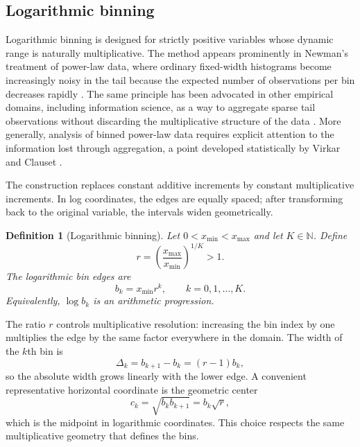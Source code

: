 \documentclass[12pt]{article}
\newcommand{\N}{\mathbb{N}}
\newtheorem{definition}{Definition}[section]
\numberwithin{equation}{section}
\begin{document}
\subsection{Logarithmic binning}

Logarithmic binning is designed for strictly positive variables whose dynamic range is naturally multiplicative. The method appears prominently in Newman's treatment of power-law data, where ordinary fixed-width histograms become increasingly noisy in the tail because the expected number of observations per bin decreases rapidly \cite{Newman2005}. The same principle has been advocated in other empirical domains, including information science, as a way to aggregate sparse tail observations without discarding the multiplicative structure of the data \cite{Milojevic2010}. More generally, analysis of binned power-law data requires explicit attention to the information lost through aggregation, a point developed statistically by Virkar and Clauset \cite{VirkarClauset2014}.

The construction replaces constant additive increments by constant multiplicative increments. In log coordinates, the edges are equally spaced; after transforming back to the original variable, the intervals widen geometrically.

\begin{definition}[Logarithmic binning]
Let $0<x_{\min}<x_{\max}$ and let $K\in\N$. Define
\begin{equation}
 r=\left(\frac{x_{\max}}{x_{\min}}\right)^{1/K}>1.
\end{equation}
The logarithmic bin edges are
\begin{equation}
 b_k=x_{\min}r^k,
 \qquad k=0,1,\ldots,K.
\label{eq:log-edges}
\end{equation}
Equivalently, $\log b_k$ is an arithmetic progression.
\end{definition}

The ratio $r$ controls multiplicative resolution: increasing the bin index by one multiplies the edge by the same factor everywhere in the domain. The width of the $k$th bin is
\begin{equation}
 \Delta_k=b_{k+1}-b_k=(r-1)b_k,
\label{eq:log-width}
\end{equation}
so the absolute width grows linearly with the lower edge. A convenient representative horizontal coordinate is the geometric center
\begin{equation}
 c_k=\sqrt{b_kb_{k+1}}=b_k\sqrt{r},
\end{equation}
which is the midpoint in logarithmic coordinates. This choice respects the same multiplicative geometry that defines the bins.
\end{document}

